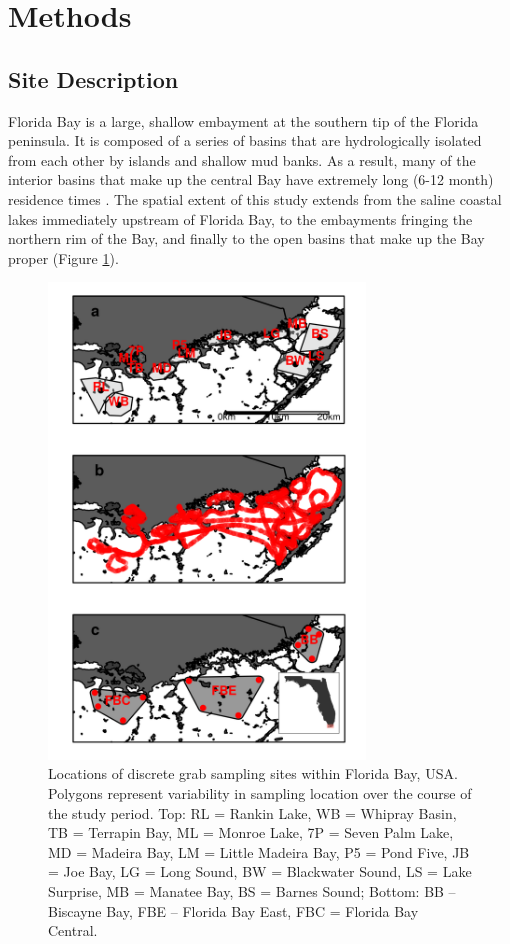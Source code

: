\section{Methods}
\label{methods}
\subsection{Site Description}
\label{sitedescription}
Florida Bay is a large, shallow embayment at the southern tip of the Florida peninsula. It is composed of a series of basins that are hydrologically isolated from each other by islands and shallow mud banks. As a result, many of the interior basins that make up the central Bay have extremely long (6-12 month) residence times \citep{lee2016circulation}. The spatial extent of this study extends from the saline coastal lakes immediately upstream of Florida Bay, to the embayments fringing the northern rim of the Bay, and finally to the open basins that make up the Bay proper (Figure \ref{fig:1}). 

\begin{figure}
  \centering
  \includegraphics[width=0.75\textwidth]{../../figures/fbmap.png}
  \caption{Locations of discrete grab sampling sites within Florida Bay, USA. Polygons represent variability in sampling location over the course of the study period. Top: RL = Rankin Lake, WB = Whipray Basin, TB = Terrapin Bay, ML = Monroe Lake, 7P = Seven Palm Lake, MD = Madeira Bay, LM = Little Madeira Bay, P5 = Pond Five, JB = Joe Bay, LG = Long Sound, BW = Blackwater Sound, LS = Lake Surprise, MB = Manatee Bay, BS = Barnes Sound; Bottom: BB – Biscayne Bay, FBE – Florida Bay East, FBC = Florida Bay Central.}
  \label{fig:1}
\end{figure}

